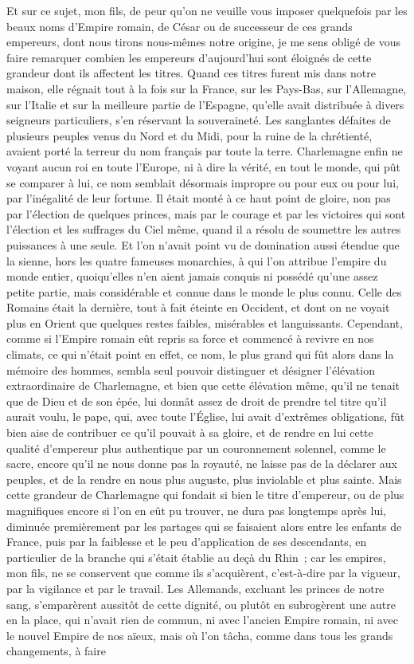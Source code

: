 \documentclass[french,twoside]{book} %
\begin{document}
Et sur ce sujet, mon fils, de peur qu’on ne veuille vous imposer quelquefois par les beaux noms d’Empire romain, de César ou de successeur de ces grands empereurs, dont nous tirons nous-mêmes notre origine, je me sens obligé de vous faire remarquer combien les empereurs d’aujourd’hui sont éloignés de cette grandeur dont ils affectent les titres. Quand ces titres furent mis dans notre maison, elle régnait tout à la fois sur la France, sur les Pays-Bas, sur l’Allemagne, sur l’Italie et sur la meilleure partie de l’Espagne, qu’elle avait distribuée à divers seigneurs particuliers, s’en réservant la souveraineté. Les sanglantes défaites de plusieurs peuples venus du Nord et du Midi, pour la ruine de la chrétienté, avaient porté la terreur du nom français par toute la terre. Charlemagne enfin ne voyant aucun roi en toute l’Europe, ni à dire la vérité, en tout le monde, qui pût se comparer à lui, ce nom semblait désormais impropre ou pour eux ou pour lui, par l’inégalité de leur fortune. Il était monté à ce haut point de gloire, non pas par l’élection de quelques princes, mais par le courage et par les victoires qui sont l’élection et les suffrages du Ciel même, quand il a résolu de soumettre les autres puissances à une seule. Et l’on n’avait point vu de domination aussi étendue que la sienne, hors les quatre fameuses monarchies, à qui l’on attribue l’empire du monde entier, quoiqu’elles n’en aient jamais conquis ni possédé qu’une assez petite partie, mais considérable et connue dans le monde le plus connu. Celle des Romains était la dernière, tout à fait éteinte en Occident, et dont on ne voyait plus en Orient que quelques restes faibles, misérables et languissants. Cependant, comme si l’Empire romain eût repris sa force et commencé à revivre en nos climats, ce qui n’était point en effet, ce nom, le plus grand qui fût alors dans la mémoire des hommes, sembla seul pouvoir distinguer et désigner l’élévation extraordinaire de Charlemagne, et bien que cette élévation même, qu’il ne tenait que de Dieu et de son épée, lui donnât assez de droit de prendre tel titre qu’il aurait voulu, le pape, qui, avec toute l’Église, lui avait d’extrêmes obligations, fût bien aise de contribuer ce qu’il pouvait à sa gloire, et de rendre en lui cette qualité d’empereur plus authentique par un couronnement solennel, comme le sacre, encore qu’il ne nous donne pas la royauté, ne laisse pas de la déclarer aux peuples, et de la rendre en nous plus auguste, plus inviolable et plus sainte. Mais cette grandeur de Charlemagne qui fondait si bien le titre d’empereur, ou de plus magnifiques encore si l’on en eût pu trouver, ne dura pas longtemps après lui, diminuée premièrement par les partages qui se faisaient alors entre les enfants de France, puis par la faiblesse et le peu d’application de ses descendants, en particulier de la branche qui s’était établie au deçà du Rhin ; car les empires, mon fils, ne se conservent que comme ils s’acquièrent, c’est-à-dire par la vigueur, par la vigilance et par le travail. Les Allemands, excluant les princes de notre sang, s’emparèrent aussitôt de cette dignité, ou plutôt en subrogèrent une autre en la place, qui n’avait rien de commun, ni avec l’ancien Empire romain, ni avec le nouvel Empire de nos aïeux, mais où l’on tâcha, comme dans tous les grands changements, à faire 
\end{document}
